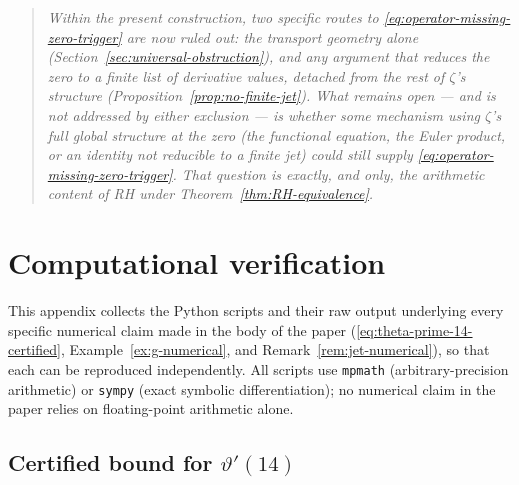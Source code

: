 \documentclass[11pt]{amsart}
\numberwithin{equation}{section}
\begin{document}
\begin{quote}
\itshape
Within the present construction, two specific routes to
\eqref{eq:operator-missing-zero-trigger} are now ruled out: the transport
geometry alone (Section~\ref{sec:universal-obstruction}), and any argument
that reduces the zero to a finite list of derivative values, detached from
the rest of $\zeta$'s structure (Proposition~\ref{prop:no-finite-jet}).
What remains open --- and is not addressed by either exclusion --- is
whether some mechanism using $\zeta$'s full global structure at the zero
(the functional equation, the Euler product, or an identity not reducible
to a finite jet) could still supply \eqref{eq:operator-missing-zero-trigger}.
That question is exactly, and only, the arithmetic content of RH under
Theorem~\ref{thm:RH-equivalence}.
\end{quote}

\appendix
\section{Computational verification}
\label{app:computations}

This appendix collects the Python scripts and their raw output underlying
every specific numerical claim made in the body of the paper
(\eqref{eq:theta-prime-14-certified}, Example~\ref{ex:g-numerical},
and Remark~\ref{rem:jet-numerical}), so that each can be reproduced
independently. All scripts use \texttt{mpmath} (arbitrary-precision
arithmetic) or \texttt{sympy} (exact symbolic differentiation); no numerical
claim in the paper relies on floating-point arithmetic alone.

\subsection{Certified bound for \texorpdfstring{$\vartheta'(14)$}{theta'(14)}}
\label{app:A1}
\end{document}

